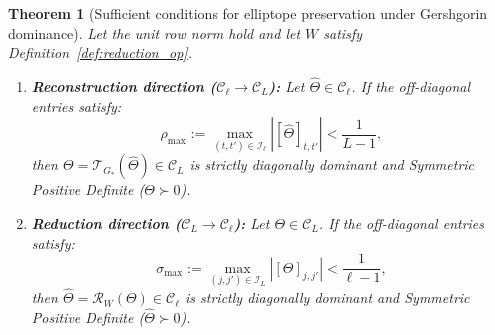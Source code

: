 \documentclass[default,sn-mathphys,Numbered]{sn-jnl}
\theoremstyle{thmstyleone}
\newtheorem{theorem}{Theorem}
\theoremstyle{thmstylethree}
\theoremstyle{thmstyletwo}
\begin{document}
\begin{theorem}[Sufficient conditions for elliptope preservation under Gershgorin dominance]
\label{th:spd_condition}
Let the unit row norm hold and let $W$ satisfy Definition~\ref{def:reduction_op}.
\begin{enumerate}
    \item[(a)] \textbf{Reconstruction direction ($\mathcal{C}_\ell \to \mathcal{C}_L$):} Let $\hat{\Theta} \in \mathcal{C}_\ell$. If the off-diagonal entries satisfy:
    \begin{equation}
    \label{eq:recon_bound}
    \rho_{\max} := \max_{(t,t') \in \mathcal{I}_\ell} |[\hat{\Theta}]_{t, t'}| < \frac{1}{L - 1},
    \end{equation}
    then $\Theta = \mathcal{T}_{G_*}(\hat{\Theta}) \in \mathcal{C}_L$ is strictly diagonally dominant and Symmetric Positive Definite ($\Theta \succ 0$).
    \item[(b)] \textbf{Reduction direction ($\mathcal{C}_L \to \mathcal{C}_\ell$):} Let $\Theta \in \mathcal{C}_L$. If the off-diagonal entries satisfy:
    \begin{equation}
    \label{eq:reduc_bound}
    \sigma_{\max} := \max_{(j,j') \in \mathcal{I}_L} |[\Theta]_{j, j'}| < \frac{1}{\ell - 1},
    \end{equation}
    then $\hat{\Theta} = \mathcal{R}_W(\Theta) \in \mathcal{C}_\ell$ is strictly diagonally dominant and Symmetric Positive Definite ($\hat{\Theta} \succ 0$).
\end{enumerate}
\end{theorem}
\end{document}
